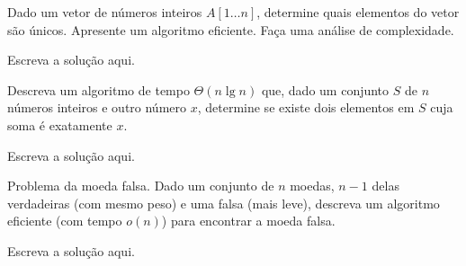 \documentclass[a4paper]{exam}
\begin{document}
\begin{questions}
  \question Dado um vetor de números inteiros $A[1 \ldots n]$, determine
  quais elementos do vetor são únicos. Apresente um algoritmo eficiente.
  Faça uma análise de complexidade.
  \begin{solution}
    Escreva a solução aqui.
  \end{solution}
  \question Descreva um algoritmo de tempo $\Theta(n \lg n)$ que, dado
  um conjunto $S$ de $n$ números inteiros e outro número $x$, determine
  se existe dois elementos em $S$ cuja soma é exatamente $x$.
  \begin{solution}
    Escreva a solução aqui.
  \end{solution}
  \question Problema da moeda falsa. Dado um conjunto de $n$ moedas,
  $n-1$ delas verdadeiras (com mesmo peso) e uma falsa (mais leve),
  descreva um algoritmo eficiente (com tempo $o(n)$) para encontrar
  a moeda falsa.
  \begin{solution}
    Escreva a solução aqui.
  \end{solution}
  
\end{questions}
\end{document}
